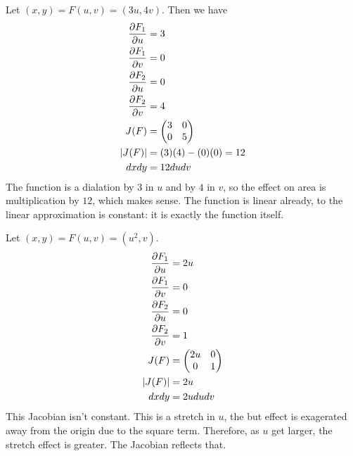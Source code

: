\documentclass[fleqn,letterpaper]{report}
\begin{document}
\begin{example}
 Let $(x,y) = F(u,v) = (3u, 4v)$. Then we have
\begin{align*}
\frac{\partial F_1}{\partial u} & = 3 \\
\frac{\partial F_1}{\partial v} & = 0 \\
\frac{\partial F_2}{\partial u} & = 0 \\
\frac{\partial F_2}{\partial v} & = 4 \\
J(F) & = \left( \begin{matrix} 3 & 0 \\ 0 & 5 \end{matrix}
\right) \\
|J(F)| & = (3)(4) - (0)(0) = 12 \\
dx dy & = 12 du dv 
\end{align*}
The function is a dialation by $3$ in $u$ and by $4$ in $v$,
so the effect on area is multiplication by $12$, which makes
sense. The function is linear already, to the linear
approximation is constant: it is exactly the function itself.
\end{example}

\begin{example}
Let $(x,y) = F(u,v) = (u^2, v)$.
\begin{align*}
\frac{\partial F_1}{\partial u} & = 2u \\
\frac{\partial F_1}{\partial v} & = 0 \\
\frac{\partial F_2}{\partial u} & = 0 \\
\frac{\partial F_2}{\partial v} & = 1 \\
J(F) & = \left( \begin{matrix} 2u & 0 \\ 0 & 1 
\end{matrix} \right) \\
|J(F)| & = 2u \\
dx dy & = 2u du dv
\end{align*} 
This Jacobian isn't constant. This is a stretch in $u$, the
but effect is exagerated away from the origin due to the
square term. Therefore, as $u$ get larger, the stretch effect
is greater. The Jacobian reflects that.
\end{example}
\end{document}
